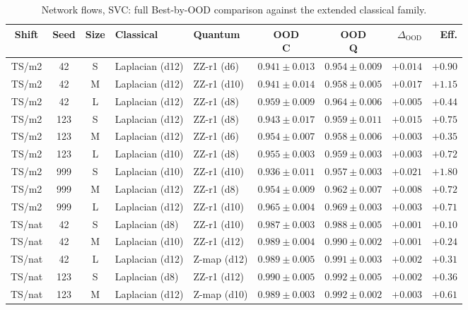 \documentclass[journal]{IEEEtran}
\begin{document}
\begin{table}[!t]
\centering
\caption{Network flows, SVC: full Best-by-OOD comparison against the extended classical family.}
\label{app:netflow_svc}
\scriptsize
\setlength{\tabcolsep}{2pt}
\begin{tabular}{@{}ccc ll cc rr@{}}
\toprule
Shift & Seed & Size & Classical & Quantum & \shortstack{OOD\\C} & \shortstack{OOD\\Q} & $\Delta_{\mathrm{OOD}}$ & Eff. \\
\midrule
TS/m2 & 42 & S & Laplacian (d12) & ZZ-r1 (d6) & $0.941\pm0.013$ & $0.954\pm0.009$ & $+0.014$ & $+0.90$ \\
TS/m2 & 42 & M & Laplacian (d12) & ZZ-r1 (d10) & $0.941\pm0.014$ & $0.958\pm0.005$ & $+0.017$ & $+1.15$ \\
TS/m2 & 42 & L & Laplacian (d12) & ZZ-r1 (d8) & $0.959\pm0.009$ & $0.964\pm0.006$ & $+0.005$ & $+0.44$ \\
TS/m2 & 123 & S & Laplacian (d12) & ZZ-r1 (d8) & $0.943\pm0.017$ & $0.959\pm0.011$ & $+0.015$ & $+0.75$ \\
TS/m2 & 123 & M & Laplacian (d12) & ZZ-r1 (d6) & $0.954\pm0.007$ & $0.958\pm0.006$ & $+0.003$ & $+0.35$ \\
TS/m2 & 123 & L & Laplacian (d10) & ZZ-r1 (d8) & $0.955\pm0.003$ & $0.959\pm0.003$ & $+0.003$ & $+0.72$ \\
TS/m2 & 999 & S & Laplacian (d10) & ZZ-r1 (d10) & $0.936\pm0.011$ & $0.957\pm0.003$ & $+0.021$ & $+1.80$ \\
TS/m2 & 999 & M & Laplacian (d12) & ZZ-r1 (d8) & $0.954\pm0.009$ & $0.962\pm0.007$ & $+0.008$ & $+0.72$ \\
TS/m2 & 999 & L & Laplacian (d12) & ZZ-r1 (d10) & $0.965\pm0.004$ & $0.969\pm0.003$ & $+0.003$ & $+0.71$ \\
TS/nat & 42 & S & Laplacian (d8) & ZZ-r1 (d10) & $0.987\pm0.003$ & $0.988\pm0.005$ & $+0.001$ & $+0.10$ \\
TS/nat & 42 & M & Laplacian (d10) & ZZ-r1 (d12) & $0.989\pm0.004$ & $0.990\pm0.002$ & $+0.001$ & $+0.24$ \\
TS/nat & 42 & L & Laplacian (d12) & Z-map (d12) & $0.989\pm0.005$ & $0.991\pm0.003$ & $+0.002$ & $+0.31$ \\
TS/nat & 123 & S & Laplacian (d8) & ZZ-r1 (d12) & $0.990\pm0.005$ & $0.992\pm0.005$ & $+0.002$ & $+0.36$ \\
TS/nat & 123 & M & Laplacian (d12) & Z-map (d10) & $0.989\pm0.003$ & $0.992\pm0.002$ & $+0.003$ & $+0.61$ \\

\end{tabular}
\end{table}
\end{document}
